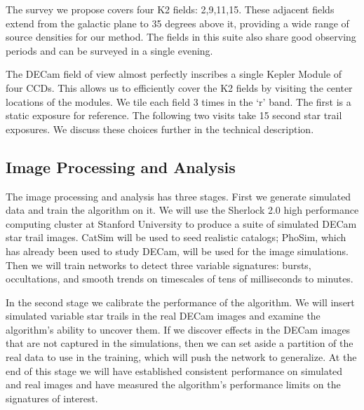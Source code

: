 \documentclass[11pt]{article}
\begin{document}

The survey we propose covers four K2 fields: 2,9,11,15. These adjacent fields extend from the galactic plane to 35 degrees above it, providing a wide range of source densities for our method. The fields in this suite also share good observing periods and can be surveyed in a single evening.

The DECam field of view almost perfectly inscribes a single Kepler Module of four CCDs. This allows us to efficiently cover the K2 fields by visiting the center locations of the modules. We tile each field 3 times in the `r' band. The first is a static exposure for reference. The following two visits take 15 second star trail exposures. We discuss these choices further in the technical description. 

\subsection*{Image Processing and Analysis}

The image processing and analysis has three stages. First we generate simulated data and train the algorithm on it. We will use the Sherlock 2.0 high performance computing cluster at Stanford University to produce a suite of simulated DECam star trail images. CatSim will be used to seed realistic catalogs; PhoSim, which has already been used to study DECam, will be used for the image simulations. Then we will train networks to detect three variable signatures: bursts, occultations, and smooth trends on timescales of tens of milliseconds to minutes.

In the second stage we calibrate the performance of the algorithm. We will insert simulated variable star trails in the real DECam images and examine the algorithm's ability to uncover them. If we discover effects in the DECam images that are not captured in the simulations, then we can set aside a partition of the real data to use in the training, which will push the network to generalize. At the end of this stage we will have established consistent performance on simulated and real images and have measured the algorithm's performance limits on the signatures of interest.
\end{document}
